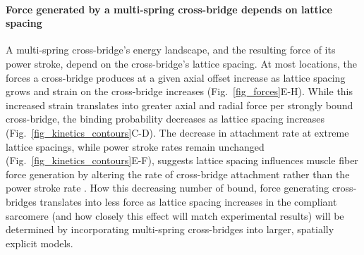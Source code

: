 \documentclass[]{article}
\begin{document}
\paragraph{Force generated by a multi-spring cross-bridge depends on lattice spacing} %
A multi-spring cross-bridge's energy landscape, and the resulting force of its power stroke, depend on the cross-bridge's lattice spacing.
At most locations, the forces a cross-bridge produces at a given axial offset increase as lattice spacing grows and strain on the cross-bridge increases (Fig.~\ref{fig_forces}E-H). 
While this increased strain translates into greater axial and radial force per strongly bound cross-bridge, the binding probability decreases as lattice spacing increases (Fig.~\ref{fig_kinetics_contours}C-D).
The decrease in attachment rate at extreme lattice spacings, while power stroke rates remain unchanged (Fig.~\ref{fig_kinetics_contours}E-F), suggests lattice spacing influences muscle fiber force generation by altering the rate of cross-bridge attachment rather than the power stroke rate \citep{Martyn2004}. 
How this decreasing number of bound, force generating cross-bridges translates into less force as lattice spacing increases in the compliant sarcomere (and how closely this effect will match experimental results) will be determined by incorporating multi-spring cross-bridges into larger, spatially explicit models. 
\end{document}
